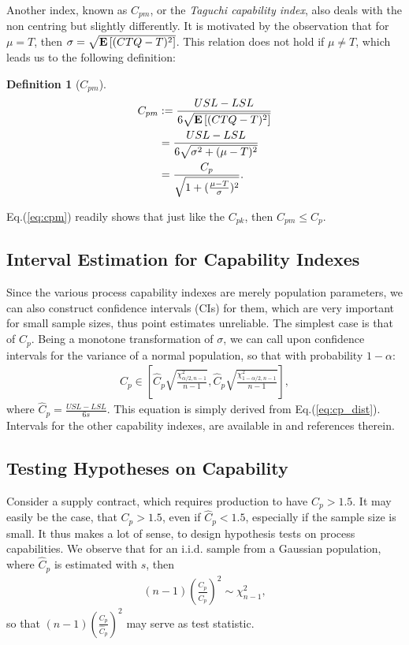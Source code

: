 \documentclass[12pt,a4paper]{report}
\theoremstyle{plain}
\theoremstyle{definition}
\newtheorem{definition}{Definition}
\newcommand{\targetValue}{T}\newcommand{\cp}{C_p}\newcommand{\cpHat}{\hat{C}_p}\newcommand{\ctqExpect}{\mu}
\newcommand{\cpk}{C_{pk}}
\newcommand{\cpm}{C_{pm}}
\begin{document}
Another index, known as $\cpm$, or the \emph{Taguchi capability index}, also deals with the non centring but slightly differently. 
It is motivated by the observation that for $\ctqExpect=\targetValue$, then $\sigma=\sqrt{\expect{(CTQ-\targetValue)^2}}$. This relation does not hold if $\ctqExpect \not=\targetValue$, which leads us to the following definition:
\begin{definition}[$\cpm$]
\begin{align}
		\cpm &:= \frac{USL-LSL}{6 \sqrt{\expect{(CTQ-\targetValue)^2}}} \\
		&= 	\frac{USL-LSL}{6 \sqrt{\sigma^2+(\ctqExpect-\targetValue)^2}} \\ 
		&= \frac{\cp}{\sqrt{1+(\frac{\ctqExpect-\targetValue}{\sigma})^2}}. \label{eq:cpm}
\end{align}
\end{definition}
Eq.(\ref{eq:cpm}) readily shows that just like the $\cpk$, then $\cpm \leq \cp$. 








\subsection{Interval Estimation for Capability Indexes}
Since the various process capability indexes are merely population parameters, we can also construct confidence intervals (CIs) for them, which are very important for small sample sizes, thus point estimates unreliable.
The simplest case is that of $\cp$. Being a monotone transformation of $\sigma$, we can call upon confidence intervals for the variance of a normal population, so that with probability $1-\alpha$:
\begin{align}
\label{eq:ci_for_cp}
	\cp \in \left[ 
		\cpHat \sqrt{\frac{\chi^2_{\alpha/2,n-1}}{n-1}},
		\cpHat \sqrt{\frac{\chi^2_{1-\alpha/2,n-1}}{n-1}}
	\right],
\end{align}
where $\cpHat = \frac{USL-LSL}{6 s}$.
This equation is simply derived from Eq.(\ref{eq:cp_dist}).
Intervals for the other capability indexes, are available in \cite{montgomery_introduction_2007} and references therein. 




\subsection{Testing Hypotheses on Capability}
Consider a supply contract, which requires production to have $\cp>1.5$. 
It may easily be the case, that $\cp>1.5$, even if $\cpHat<1.5$, especially if the sample size is small.
It thus makes a lot of sense, to design hypothesis tests on process capabilities. 
We observe that for an i.i.d. sample from a Gaussian population, where $\cpHat$ is estimated with $s$, then
\begin{align}
\label{eq:cp_dist}
	(n-1) \left( \frac{\cp}{\cpHat} \right)^2  \sim \chi^2_{n-1},
\end{align} 
so that $(n-1) \left( \frac{\cp}{\cpHat} \right)^2 $ may serve as test statistic.
\end{document}
